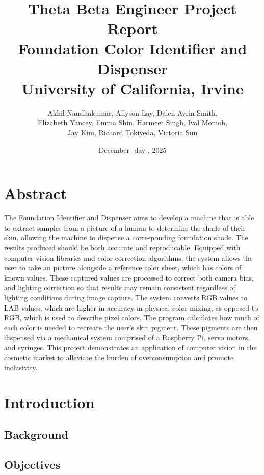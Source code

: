 \documentclass[12pt, letterpaper]{report}
\title{
    \textbf{Theta Beta Engineer Project Report}\\[0.5em]
    \large Foundation Color Identifier and Dispenser\\
    University of California, Irvine
}
\author{
    Akhil Nandhakumar, Allyson Lay, Dalen Avrin Smith,\\
    Elizabeth Yancey, Emma Shin, Harmeet Singh, Ival Momoh,\\
    Jay Kim, Richard Tokiyeda, Victoria Sun
}
\date{December -day-, 2025}
\begin{document}
    \maketitle

    \linenumbers

    \tableofcontents
    \listoffigures
    \listoftables
    \newpage


    \chapter{Abstract}
    The Foundation Identifier and Dispenser aims to develop a machine that is able to
    extract samples from a picture of a human to determine the shade of their skin, allowing
    the machine to dispense a corresponding foundation shade. The results produced
    should be both accurate and reproducable. Equipped with computer vision libraries
    and color correction algorithms, the system allows the user to take an picture alongside 
    a reference color sheet, which has colors of known values. These captured values are 
    processed to correct both camera bias, and lighting correction so that results
    may remain consistent regardless of lighting conditions during image capture. The system
    converts RGB values to LAB values, which are higher in accuracy in physical color 
    mixing, as opposed to RGB, which is used to describe pixel colors. The program calculates
    how much of each color is needed to recreate the user's skin pigment. These pigments are
    then dispensed via a mechanical system comprised of a Raspberry Pi, servo motors, and 
    syringes. This project demonstrates an application of computer vision in the cosmetic
    market to alleviate the burden of overconsumption and promote inclusivity. 


    \chapter{Introduction}

    \section{Background}

    \section{Objectives}
\end{document}
